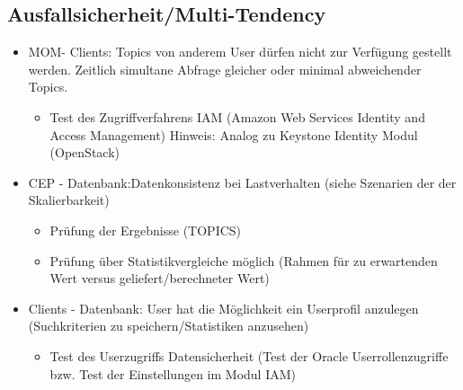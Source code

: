 \documentclass[paper,oneside,onecolumn,notitlepage,bibtotocnumbered,fontsize=12pt,bigheadings,ngerman]{scrartcl}
\begin{document}
\subsection{Ausfallsicherheit/Multi-Tendency}

\begin{itemize}



\item MOM- Clients:	Topics von anderem User dürfen nicht zur Verfügung gestellt werden. Zeitlich simultane Abfrage gleicher oder minimal abweichender Topics.		
\begin{itemize}
\item Test des Zugriffverfahrens IAM (Amazon Web Services Identity and Access Management) Hinweis: Analog zu Keystone Identity Modul (OpenStack)
\end{itemize}




\item CEP - Datenbank:Datenkonsistenz bei Lastverhalten
(siehe Szenarien der der Skalierbarkeit)
\begin{itemize}
\item Prüfung der Ergebnisse (TOPICS)
\item Prüfung über Statistikvergleiche möglich (Rahmen für zu erwartenden Wert versus geliefert/berechneter Wert) 
\end{itemize}



\item Clients - Datenbank:	User hat die Möglichkeit ein Userprofil anzulegen (Suchkriterien zu speichern/Statistiken anzusehen)
\begin{itemize}
\item Test des Userzugriffs Datensicherheit (Test der Oracle Userrollenzugriffe bzw. Test der Einstellungen im Modul IAM)
\end{itemize}
\end{itemize}
\end{document}
